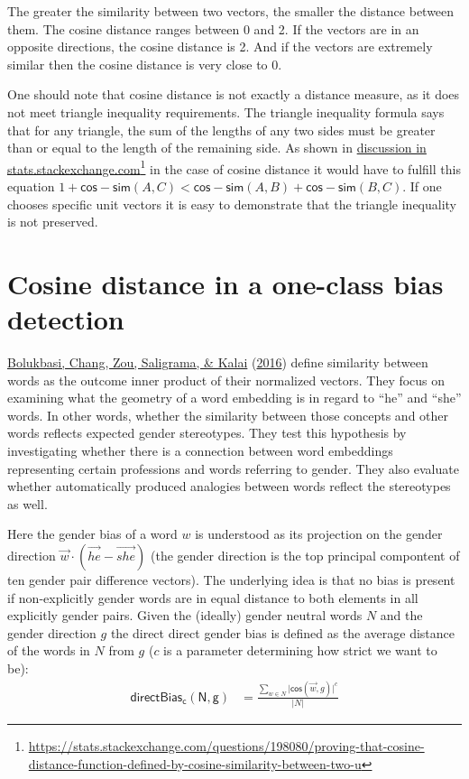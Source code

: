 \documentclass[
  12pt,
]{book}
\begin{document}
The greater the similarity between two vectors, the smaller the distance between them. The cosine distance ranges between 0 and 2. If the vectors are in an opposite directions, the cosine distance is 2. And if the vectors are extremely similar then the cosine distance is very close to 0.

One should note that cosine distance is not exactly a distance measure, as it does not meet triangle inequality requirements. The triangle inequality formula says that for any triangle, the sum of the lengths of any two sides must be greater than or equal to the length of the remaining side. As shown in \href{https://stats.stackexchange.com/questions/198080/proving-that-cosine-distance-function-defined-by-cosine-similarity-between-two-u}{discussion in stats.stackexchange.com}\footnote{\url{https://stats.stackexchange.com/questions/198080/proving-that-cosine-distance-function-defined-by-cosine-similarity-between-two-u}} in the case of cosine distance it would have to fulfill this equation \(1+\mathsf{cos-sim}(A,C) < \mathsf{cos-sim}(A,B) + \mathsf{cos-sim}(B,C)\). If one chooses specific unit vectors it is easy to demonstrate that the triangle inequality is not preserved.

\hypertarget{cosine-distance-in-a-one-class-bias-detection}{%
\section{Cosine distance in a one-class bias detection}\label{cosine-distance-in-a-one-class-bias-detection}}

\protect\hyperlink{ref-Bolukbasi2016Man}{Bolukbasi, Chang, Zou, Saligrama, \& Kalai} (\protect\hyperlink{ref-Bolukbasi2016Man}{2016}) define similarity between words as the outcome inner product of their normalized vectors.
They focus on examining what the geometry of a word embedding is in regard to ``he'' and ``she'' words. In other words, whether the similarity between those concepts and other words reflects expected gender stereotypes. They test this hypothesis by investigating whether there is a connection between word embeddings representing certain professions and words referring to gender. They also evaluate whether automatically produced analogies between words reflect the stereotypes as well.

Here the gender bias of a word \(w\) is understood as its projection on the gender direction \(\vec{w} \cdot (\overrightarrow{he} - \overrightarrow{she})\) (the gender direction is the top principal compontent of ten gender pair difference vectors). The underlying idea is that no bias is present if non-explicitly gender words are in equal distance to both elements in all explicitly gender pairs. Given the (ideally) gender neutral words \(N\) and the gender direction \(g\) the direct direct gender bias is defined as the average distance of the words in \(N\) from \(g\) (\(c\) is a parameter determining how strict we want to be):
\begin{align}
\mathsf{directBias_c(N,g)} & = \frac{\sum_{w\in N}\vert \mathsf{cos}(\vec{w},g)\vert^c}{\vert N \vert }
\end{align}
\end{document}
